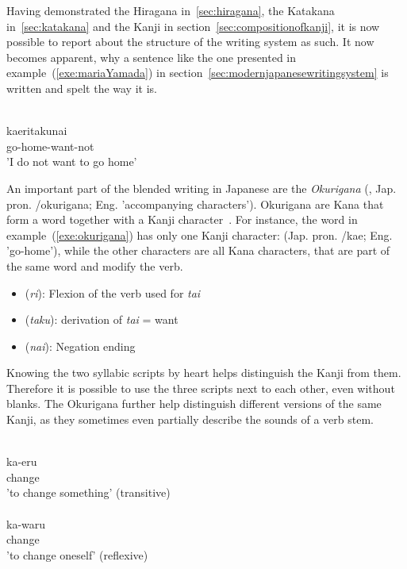 Having demonstrated the Hiragana in~\ref{sec:hiragana}, the Katakana 
in~\ref{sec:katakana} and the Kanji in section~\ref{sec:compositionofkanji}, 
it is now possible to report about the structure of the writing system as such.
It now becomes apparent, why a sentence like the one presented in 
example~(\ref{exe:mariaYamada}) in section~\ref{sec:modernjapanesewritingsystem} 
is written and spelt the way it is.
\begin{exe}
\ex\label{exe:okurigana}
\gll 
  \\
 kaeritakunai \\
 go-home-want-not \\
\trans 'I do not want to go home' \\
\end{exe}
An important part of the blended writing in Japanese are the 
\emph{Okurigana} (, Jap. pron. /okurigana; 
Eng. 'accompanying characters'). Okurigana are Kana that form 
a word together with a Kanji character~.
For instance, the word in example~(\ref{exe:okurigana}) has only one Kanji 
character:  (Jap. pron. /kae; Eng. 'go-home'), while the other characters are all Kana characters, that are part of the same word and modify
the verb.
\begin{itemize}
  \item {} (\emph{ri}): Flexion of the verb used for \emph{tai}
  \item {} (\emph{taku}): derivation of \emph{tai} = want
  \item {} (\emph{nai}): Negation ending
\end{itemize}
Knowing the two syllabic scripts by heart helps distinguish the Kanji from them.
Therefore it is possible to use the three scripts next to each other, even 
without blanks. The Okurigana further help distinguish different versions of 
the same Kanji, as they sometimes even partially describe the sounds of a 
verb stem.
\begin{exe}
\ex\label{exe:stemspelling}
\begin{xlist}
\ex\label{exe:stemspellingkaeru}
\gll 
  \\
 ka-eru \\
 change \\
\trans 'to change something' (transitive) \\

\ex\label{exe:stemspellingkawaru}
\gll 
  \\
 ka-waru \\
 change \\
\trans 'to change oneself' (reflexive) \\
\end{xlist}
\end{exe}
